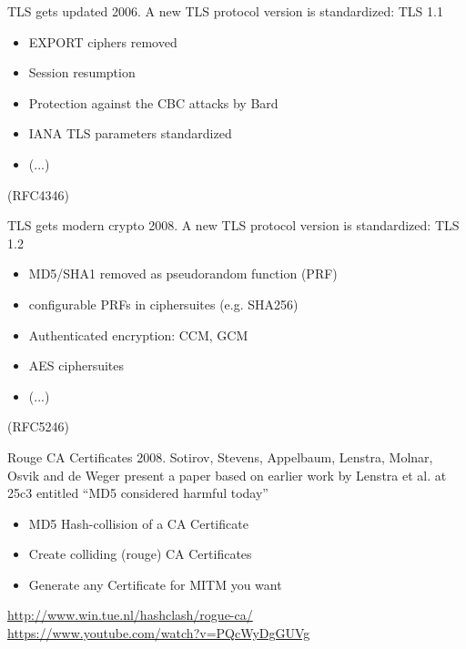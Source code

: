 \begin{frame}{TLS gets updated}
  2006. A new TLS protocol version is standardized: TLS 1.1
  \begin{itemize}
    \item EXPORT ciphers removed
    \item Session resumption 
    \item Protection against the CBC attacks by Bard
    \item IANA TLS parameters standardized
    \item (...)
  \end{itemize}
   (RFC4346)
\end{frame}

\begin{frame}{TLS gets modern crypto}
  2008. A new TLS protocol version is standardized: TLS 1.2
  \begin{itemize}
    \item MD5/SHA1 removed as pseudorandom function (PRF)
    \item configurable PRFs in ciphersuites (e.g. SHA256)
    \item Authenticated encryption: CCM, GCM
    \item AES ciphersuites
    \item (...)
  \end{itemize}
   (RFC5246)
\end{frame}

\begin{frame}{Rouge CA Certificates}
  2008. Sotirov, Stevens, Appelbaum, Lenstra, Molnar, Osvik and de Weger present a paper based on earlier work by Lenstra et al. at 25c3 entitled ``MD5 considered harmful today''

  \begin{itemize}
    \item MD5 Hash-collision of a CA Certificate
    \item Create colliding (rouge) CA Certificates
    \item Generate any Certificate for MITM you want
  \end{itemize}

  \vspace{60px}

  \tiny
  \url{http://www.win.tue.nl/hashclash/rogue-ca/}\\
  \url{https://www.youtube.com/watch?v=PQcWyDgGUVg}\\
\end{frame}

